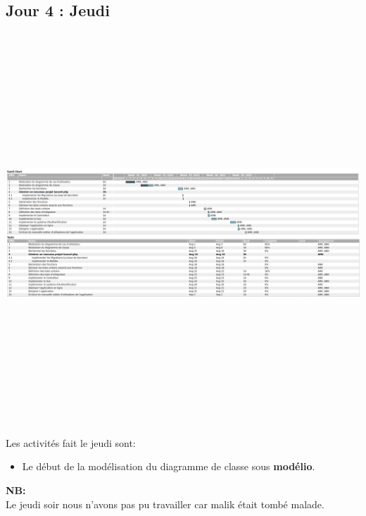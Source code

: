 \documentclass[12pt,a4paper]{article}
\begin{document}
\subsection{Jour 4 : Jeudi}
\includegraphics[height=15cm,width=22cm]{images/jour4.png}
Les activités fait le jeudi sont:
\begin{itemize}
\item Le début de la modélisation du diagramme de classe sous \textbf{modélio}.
\end{itemize}

\textbf{NB:}\\
Le jeudi soir nous n'avons pas pu travailler car malik était tombé malade.
\end{document}
